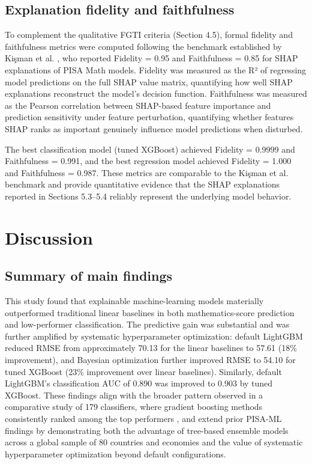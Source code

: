 \documentclass[pdflatex,sn-mathphys-ay]{sn-jnl}
\begin{document}
\FloatBarrier
\subsection{Explanation fidelity and faithfulness}

To complement the qualitative FGTI criteria (Section 4.5), formal fidelity and faithfulness metrics were computed following the benchmark established by Kişman et al. \citep{Kisman_2026}, who reported Fidelity = 0.95 and Faithfulness = 0.85 for SHAP explanations of PISA Math models. Fidelity was measured as the R² of regressing model predictions on the full SHAP value matrix, quantifying how well SHAP explanations reconstruct the model's decision function. Faithfulness was measured as the Pearson correlation between SHAP-based feature importance and prediction sensitivity under feature perturbation, quantifying whether features SHAP ranks as important genuinely influence model predictions when disturbed.

The best classification model (tuned XGBoost) achieved Fidelity = 0.9999 and Faithfulness = 0.991, and the best regression model achieved Fidelity = 1.000 and Faithfulness = 0.987. These metrics are comparable to the Kişman et al. benchmark and provide quantitative evidence that the SHAP explanations reported in Sections 5.3--5.4 reliably represent the underlying model behavior.

\FloatBarrier
\section{Discussion}

\FloatBarrier
\subsection{Summary of main findings}

This study found that explainable machine-learning models materially outperformed traditional linear baselines in both mathematics-score prediction and low-performer classification. The predictive gain was substantial and was further amplified by systematic hyperparameter optimization: default LightGBM reduced RMSE from approximately 70.13 for the linear baselines to 57.61 (18\% improvement), and Bayesian optimization further improved RMSE to 54.10 for tuned XGBoost (23\% improvement over linear baselines). Similarly, default LightGBM's classification AUC of 0.890 was improved to 0.903 by tuned XGBoost. These findings align with the broader pattern observed in a comparative study of 179 classifiers, where gradient boosting methods consistently ranked among the top performers \citep{Fernandez_Delgado_2014}, and extend prior PISA-ML findings by demonstrating both the advantage of tree-based ensemble models across a global sample of 80 countries and economies and the value of systematic hyperparameter optimization beyond default configurations.
\end{document}
